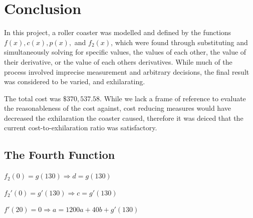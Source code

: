 \documentclass[11pt, letterpaper]{article}
\begin{document}
\section{Conclusion}
In this project, a roller coaster was modelled and defined by the functions $f(x), c(x), p(x),$ and $f_2(x)$, which were found through substituting and simultaneously solving for specific values, the values of each other, the value of their derivative, or the value of each others derivatives. While much of the process involved imprecise measurement and arbitrary decisions, the final result was considered to be varied, and exhilarating. 

The total cost was $\$370,537.58$. While we lack a frame of reference to evaluate the reasonableness of the cost against, cost reducing measures would have decreased the exhilaration the coaster caused, therefore it was deiced that the current cost-to-exhilaration ratio was satisfactory.



\begin{appendices}

	\section{The Fourth Function}
	$f_2(0)=g(130)\Rightarrow d=g(130)$
	
	$f_2'(0) = g'(130)\Rightarrow c=g'(130)$
	
	$f'(20)=0\Rightarrow a=1200a+40b+g'(130)$
	
	
\end{appendices}
\end{document}
